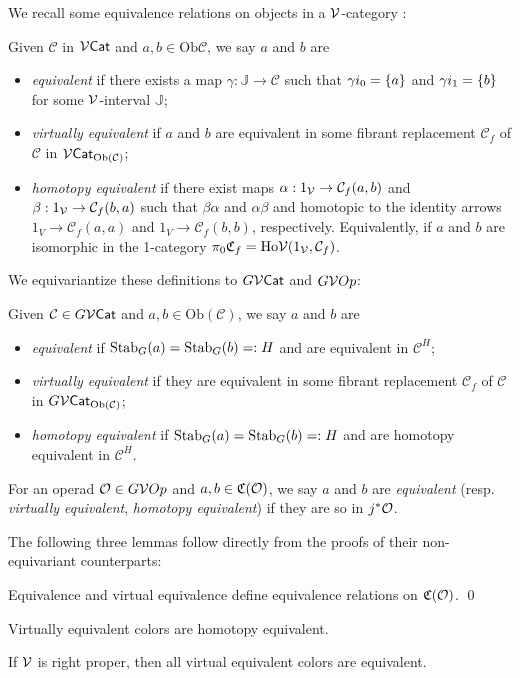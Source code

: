 \documentclass[psamsfonts,onesided,10pt,letterpaper]{amsart}%
\renewcommand{\C}{\ensuremath{\mathfrak{C}}}
\newcommand{\J}{\ensuremath{\mathbb{J}}}
\begin{document}
We recall some equivalence relations on objects in a $\mathcal V$-category \cite{Cav14, BM13}:
\begin{definition}
  Given $\mathcal{C}$ in $\mathcal V\mathsf{Cat}$ and $a,b\in\mathrm{Ob}{\mathcal C}$, we say $a$ and $b$ are
  \begin{itemize}
  \item {\em equivalent} if there exists a map $\gamma: \J \to \mathcal C$ such that $\gamma i_0 = \left\{a\right\}$ and $\gamma i_1 = \left\{b\right\}$ for some $\mathcal V$-interval $\J$;
  \item {\em virtually equivalent} if $a$ and $b$ are equivalent in some fibrant replacement $\mathcal C_f$ of $\mathcal C$ in $\mathcal V\mathsf{Cat}_{\mathrm{Ob}(\mathcal C)}$;
  \item {\em homotopy equivalent} if there exist maps $\alpha: 1_{\mathcal V} \to \mathcal C_f(a,b)$ and $\beta: 1_{\mathcal V}\to \mathcal C_f(b,a)$ such that $\beta\alpha$ and $\alpha\beta$ and homotopic to the identity arrows $1_V\to \mathcal C_f(a,a)$ and $1_V\to\mathcal C_f(b,b)$, respectively. Equivalently, if $a$ and $b$ are isomorphic in the 1-category $\pi_0\C_f = \mathrm{Ho}\V(1_\V, \mathcal C_f)$.
  \end{itemize}
\end{definition}

We equivariantize these definitions to $G\mathcal V\mathsf{Cat}$ and $G\mathcal V Op$:
\begin{definition}
  Given $\mathcal{C}\in G\mathcal V\mathsf{Cat}$ and $a,b\in \mathrm{Ob}(\mathcal{C})$, we say $a$ and $b$ are
\begin{itemize}
\item {\em equivalent} if $\mathrm{Stab}_G(a) = \mathrm{Stab}_G(b) =: H$ and are equivalent in $\mathcal{C}^H$;
\item {\em virtually equivalent} if they are equivalent in some fibrant replacement $\mathcal{C}_f$ of $\mathcal{C}$ in $G\mathcal V\mathsf{Cat}_{\mathrm{Ob}(\mathcal{C})}$;
\item {\em homotopy equivalent} if $\mathrm{Stab}_G(a) = \mathrm{Stab}_G(b) =: H$ and are homotopy equivalent in $\mathcal{C}^H$. 
\end{itemize}
For an operad $\mathcal{O}\in G\mathcal V Op$ and $a,b\in \C(\O)$, we say $a$ and $b$ are {\em equivalent} (resp. {\em virtually equivalent}, {\em homotopy equivalent}) if they are so in $j^*\mathcal{O}$. 
\end{definition}

The following three lemmas follow directly from the proofs of their non-equivariant counterparts:
\begin{lemma}
  Equivalence and virtual equivalence define equivalence relations on $\C(\O)$. \qed
\end{lemma}
\begin{lemma}
  Virtually equivalent colors are homotopy equivalent. 
\end{lemma}
\begin{lemma}
  If $\mathcal V$ is right proper, then all virtual equivalent colors are equivalent. 
\end{lemma}
\end{document}
